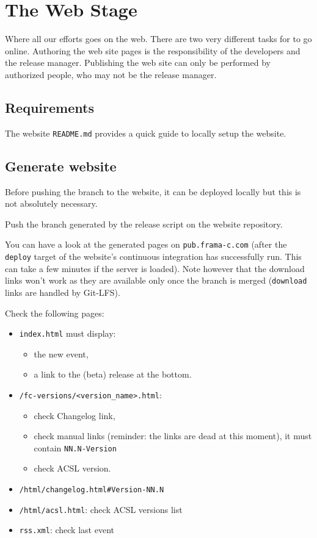 \chapter{The Web Stage}

Where all our efforts goes on the web.  There are two very different
tasks for \FramaC to go online.  Authoring the web site pages is the
responsibility of the developers and the release manager. Publishing
the web site can only be performed by authorized people, who may not
be the release manager.

\section{Requirements}

The website \texttt{README.md} provides a quick guide to locally setup
the website.

\section{Generate website}

Before pushing the branch to the website, it can be deployed locally but
this is not absolutely necessary.

Push the branch generated by the release script on the website repository.

You can have a look at the generated pages on \texttt{pub.frama-c.com} (after
the \texttt{deploy} target of the website's continuous integration has successfully run.
This can take a few minutes if the server is loaded).
Note however that the download links won't work as they are available only
once the branch is merged (\texttt{download} links are handled by Git-LFS).

Check the following pages:

\begin{itemize}
  \item \texttt{index.html} must display:
  \begin{itemize}
    \item the new event,
    \item a link to the (beta) release at the bottom.
  \end{itemize}
  \item \texttt{/fc-versions/<version\_name>.html}:
  \begin{itemize}
    \item check Changelog link,
    \item check manual links (reminder: the links are dead at this moment), it must contain \texttt{NN.N-Version}
    \item check ACSL version.
  \end{itemize}
  \item \texttt{/html/changelog.html\#Version-NN.N}
  \item \texttt{/html/acsl.html}: check ACSL versions list
  \item \texttt{rss.xml}: check last event
\end{itemize}


